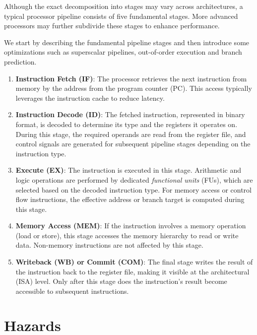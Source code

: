 Although the exact decomposition into stages may vary across architectures, a typical processor pipeline consists of five fundamental stages. More advanced processors may further subdivide these stages to enhance performance.

We start by describing the fundamental pipeline stages and then introduce some optimizations such as superscalar pipelines, out-of-order execution and branch prediction.

\begin{enumerate}
    \item \textbf{Instruction Fetch (IF)}: The processor retrieves the next instruction from memory by the address from the program counter (PC). This access typically leverages the instruction cache to reduce latency.

    \item \textbf{Instruction Decode (ID)}: The fetched instruction, represented in binary format, is decoded to determine its type and the registers it operates on. During this stage, the required operands are read from the register file, and control signals are generated for subsequent pipeline stages depending on the instruction type.

    \item \textbf{Execute (EX)}: The instruction is executed in this stage. Arithmetic and logic operations are performed by dedicated \textit{functional units} (FUs), which are selected based on the decoded instruction type. For memory access or control flow instructions, the effective address or branch target is computed during this stage.

    \item \textbf{Memory Access (MEM)}: If the instruction involves a memory operation (load or store), this stage accesses the memory hierarchy to read or write data. Non-memory instructions are not affected by this stage.

    \item \textbf{Writeback (WB) or Commit (COM)}: The final stage writes the result of the instruction back to the register file, making it visible at the architectural (ISA) level. Only after this stage does the instruction's result become accessible to subsequent instructions.
\end{enumerate}


\section{Hazards}

